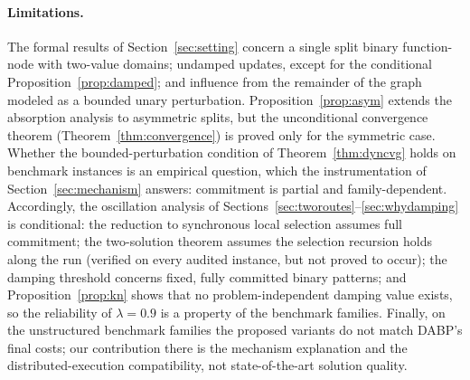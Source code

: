 \documentclass[letterpaper]{article} %
\theoremstyle{definition}
\theoremstyle{remark}
\begin{document}
\paragraph{Limitations.}
The formal results of Section~\ref{sec:setting} concern a single split binary
function-node with two-value domains; undamped updates, except for the
conditional Proposition~\ref{prop:damped}; and influence from the remainder of
the graph modeled as a bounded unary perturbation.
Proposition~\ref{prop:asym} extends the absorption analysis to asymmetric
splits, but the unconditional convergence theorem
(Theorem~\ref{thm:convergence}) is proved only for the symmetric case.
Whether the bounded-perturbation condition of Theorem~\ref{thm:dyncvg} holds
on benchmark instances is an empirical question, which the instrumentation of
Section~\ref{sec:mechanism} answers: commitment is partial and
family-dependent.  Accordingly, the oscillation analysis of
Sections~\ref{sec:tworoutes}--\ref{sec:whydamping} is conditional: the
reduction to synchronous local selection assumes full commitment; the
two-solution theorem assumes the selection recursion holds along the run
(verified on every audited instance, but not proved to occur); the damping
threshold concerns fixed, fully committed binary patterns; and
Proposition~\ref{prop:kn} shows that no problem-independent damping value
exists, so the reliability of $\lambda = 0.9$ is a property of the
benchmark families.  Finally, on the
unstructured benchmark families the proposed variants do not match DABP's
final costs; our contribution there is the mechanism explanation and the
distributed-execution compatibility, not state-of-the-art solution quality.


\appendix
\end{document}
